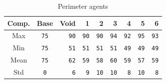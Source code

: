 \documentclass[12pt,a4paper]{IEEEtran}
\begin{document}
\begin{table}[ht]
	\centering
	\tiny
	\begin{tabular}{|c|c|r|r|r|r|r|r|r|}
		\hline
		\rowcolor[HTML]{000000} 
		{\color[HTML]{FFFFFF} Comp.} &{\color[HTML]{FFFFFF} Base} & {\color[HTML]{FFFFFF} Void} & {\color[HTML]{FFFFFF} 1} & {\color[HTML]{FFFFFF} 2} & {\color[HTML]{FFFFFF} 3} & {\color[HTML]{FFFFFF} 4} & {\color[HTML]{FFFFFF} 5} & {\color[HTML]{FFFFFF} 6}\\ \hline
		Max & \texttt{75} & \texttt{90} &\texttt{90} & \texttt{90} & \texttt{94} & \texttt{92} & \texttt{95} & \texttt{93} \\ \hline
		Min & \texttt{75} & \texttt{51} &\texttt{51}  & \texttt{51} & \texttt{51} & \texttt{49} & \texttt{49} & \texttt{49}\\ \hline
		Mean & \texttt{75} & \texttt{62} &\texttt{59}  & \texttt{58} & \texttt{60} & \texttt{59} & \texttt{57} & \texttt{59}\\ \hline
		Std & \texttt{0} & \texttt{6} &\texttt{9}  & \texttt{10} & \texttt{10} & \texttt{8} & \texttt{10} & \texttt{8}\\ \hline
	\end{tabular}
	\caption{Perimeter agents}
	\label{tab:perimeterLimits}
\end{table}



\end{document}

